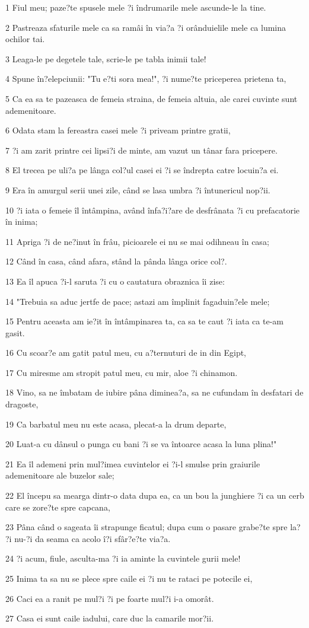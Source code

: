 \par 1 Fiul meu; paze?te spusele mele ?i îndrumarile mele ascunde-le la tine.
\par 2 Pastreaza sfaturile mele ca sa ramâi în via?a ?i orânduielile mele ca lumina ochilor tai.
\par 3 Leaga-le pe degetele tale, scrie-le pe tabla inimii tale!
\par 4 Spune în?elepciunii: "Tu e?ti sora mea!", ?i nume?te priceperea prietena ta,
\par 5 Ca ea sa te pazeasca de femeia straina, de femeia altuia, ale carei cuvinte sunt ademenitoare.
\par 6 Odata stam la fereastra casei mele ?i priveam printre gratii,
\par 7 ?i am zarit printre cei lipsi?i de minte, am vazut un tânar fara pricepere.
\par 8 El trecea pe uli?a pe lânga col?ul casei ei ?i se îndrepta catre locuin?a ei.
\par 9 Era în amurgul serii unei zile, când se lasa umbra ?i întunericul nop?ii.
\par 10 ?i iata o femeie îl întâmpina, având înfa?i?are de desfrânata ?i cu prefacatorie în inima;
\par 11 Apriga ?i de ne?inut în frâu, picioarele ei nu se mai odihneau în casa;
\par 12 Când în casa, când afara, stând la pânda lânga orice col?.
\par 13 Ea îl apuca ?i-l saruta ?i cu o cautatura obraznica îi zise:
\par 14 "Trebuia sa aduc jertfe de pace; astazi am împlinit fagaduin?ele mele;
\par 15 Pentru aceasta am ie?it în întâmpinarea ta, ca sa te caut ?i iata ca te-am gasit.
\par 16 Cu scoar?e am gatit patul meu, cu a?ternuturi de in din Egipt,
\par 17 Cu miresme am stropit patul meu, cu mir, aloe ?i chinamon.
\par 18 Vino, sa ne îmbatam de iubire pâna diminea?a, sa ne cufundam în desfatari de dragoste,
\par 19 Ca barbatul meu nu este acasa, plecat-a la drum departe,
\par 20 Luat-a cu dânsul o punga cu bani ?i se va întoarce acasa la luna plina!"
\par 21 Ea îl ademeni prin mul?imea cuvintelor ei ?i-l smulse prin graiurile ademenitoare ale buzelor sale;
\par 22 El începu sa mearga dintr-o data dupa ea, ca un bou la junghiere ?i ca un cerb care se zore?te spre capcana,
\par 23 Pâna când o sageata îi strapunge ficatul; dupa cum o pasare grabe?te spre la? ?i nu-?i da seama ca acolo î?i sfâr?e?te via?a.
\par 24 ?i acum, fiule, asculta-ma ?i ia aminte la cuvintele gurii mele!
\par 25 Inima ta sa nu se plece spre caile ei ?i nu te rataci pe potecile ei,
\par 26 Caci ea a ranit pe mul?i ?i pe foarte mul?i i-a omorât.
\par 27 Casa ei sunt caile iadului, care duc la camarile mor?ii.

